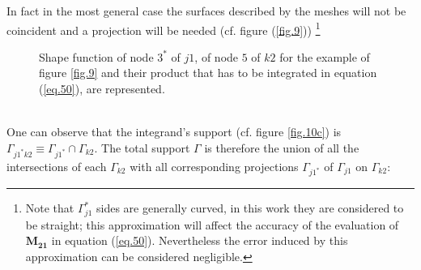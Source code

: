 In fact in the most general case the surfaces described by the meshes will not be coincident and a projection will be needed (cf. figure (\ref{fig.9})) \footnote{Note that $\Gamma_{j1}^*$ sides are generally curved, in this work they are considered to be straight; this approximation will affect the accuracy of the evaluation of $ \mathbf{M_{21}}$ in equation (\ref{eq.50}). Nevertheless the error induced by this approximation can be considered negligible.}
\begin{figure}[!ht]
\centering
     \caption{Shape function of node $3^*$ of $j1$, of node $5$ of $k2$ for the example of figure \ref{fig.9} and their product that has to be integrated in equation  (\ref{eq.50}), are represented.}
     \label{fig.10}
   \end{figure}
   \\
   One can observe that the integrand's support (cf. figure \ref{fig.10c}) is $\Gamma_{j1^*k2}\equiv \Gamma_{j1^*} \cap  \Gamma_{k2} $. The total support $\Gamma$ is therefore the union of all the intersections of each $\Gamma_{k2}$ with all corresponding projections $\Gamma_{j1^*}$ of $\Gamma_{j1}$ on $\Gamma_{k2}$:\\
